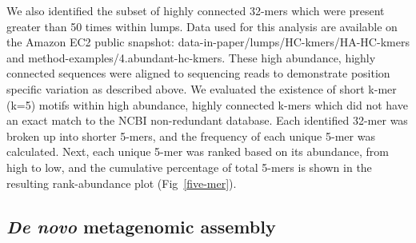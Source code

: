 \documentclass[10pt]{article}
\begin{document}
We also identified the subset of highly connected 32-mers which were
present greater than 50 times within lumps. Data used for this
analysis are available on the Amazon EC2 public snapshot:
data-in-paper/lumps/HC-kmers/HA-HC-kmers and
method-examples/4.abundant-hc-kmers. These high abundance, highly
connected sequences were aligned to sequencing reads to demonstrate
position specific variation as described above.  We evaluated the
existence of short k-mer (k=5) motifs within high abundance, highly
connected k-mers which did not have an exact match to the NCBI
non-redundant database.  Each identified 32-mer was broken up into
shorter 5-mers, and the frequency of each unique 5-mer was calculated.
Next, each unique 5-mer was ranked based on its abundance, from high
to low, and the cumulative percentage of total 5-mers is shown in the
resulting rank-abundance plot (Fig~\ref{five-mer}).
  
\subsection*{\emph{De novo} metagenomic assembly}
\end{document}

